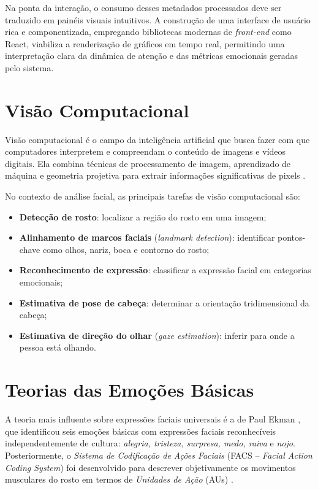 \documentclass[
	12pt,
	openright,
	oneside,
	a4paper,
	english,
	brazil
	]{abntex2}
\begin{document}
Na ponta da interação, o consumo desses metadados processados deve ser traduzido em painéis visuais intuitivos. A construção de uma interface de usuário rica e componentizada, empregando bibliotecas modernas de \textit{front-end} como React, viabiliza a renderização de gráficos em tempo real, permitindo uma interpretação clara da dinâmica de atenção e das métricas emocionais geradas pelo sistema.

\section{Visão Computacional}

Visão computacional é o campo da inteligência artificial que busca fazer com que computadores interpretem e compreendam o conteúdo de imagens e vídeos digitais. Ela combina técnicas de processamento de imagem, aprendizado de máquina e geometria projetiva para extrair informações significativas de pixels \cite{szeliski2010computer}.

No contexto de análise facial, as principais tarefas de visão computacional são:
\begin{itemize}
    \item \textbf{Detecção de rosto}: localizar a região do rosto em uma imagem;
    \item \textbf{Alinhamento de marcos faciais} (\textit{landmark detection}): identificar pontos-chave como olhos, nariz, boca e contorno do rosto;
    \item \textbf{Reconhecimento de expressão}: classificar a expressão facial em categorias emocionais;
    \item \textbf{Estimativa de pose de cabeça}: determinar a orientação tridimensional da cabeça;
    \item \textbf{Estimativa de direção do olhar} (\textit{gaze estimation}): inferir para onde a pessoa está olhando.
\end{itemize}

\section{Teorias das Emoções Básicas}

A teoria mais influente sobre expressões faciais universais é a de Paul Ekman \cite{ekman1971constants}, que identificou seis emoções básicas com expressões faciais reconhecíveis independentemente de cultura: \textit{alegria, tristeza, surpresa, medo, raiva} e \textit{nojo}. Posteriormente, o \textit{Sistema de Codificação de Ações Faciais} (FACS -- \textit{Facial Action Coding System}) foi desenvolvido para descrever objetivamente os movimentos musculares do rosto em termos de \textit{Unidades de Ação} (AUs) \cite{ekman1978facial}.
\end{document}
